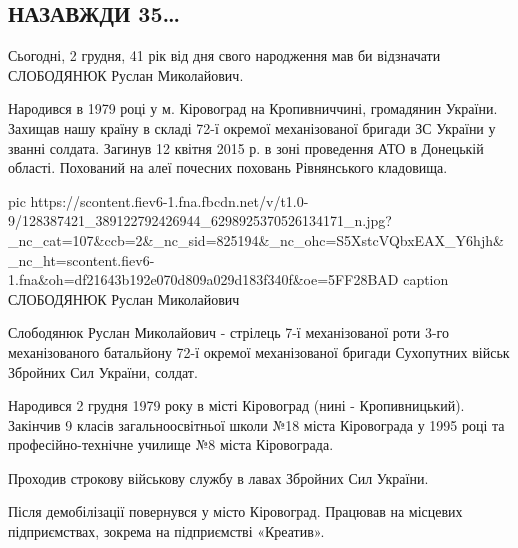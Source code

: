  
 
 
 
 

\subsection{НАЗАВЖДИ 35…}
\label{sec:03_12_2020.fb.patrioty_ukrainy.1.slobodjanjuk_ruslan_mykolajovych_35}

Сьогодні, 2 грудня, 41 рік від дня свого народження мав би відзначати СЛОБОДЯНЮК Руслан Миколайович.


Народився в 1979 році у м. Кіровоград на Кропивниччині, громадянин України.
Захищав нашу країну в складі 72-ї окремої механізованої бригади ЗС України у
званні солдата. Загинув 12 квітня 2015 р. в зоні проведення АТО в Донецькій
області. Похований на алеї почесних поховань Рівнянського кладовища.

\ifcmt
pic https://scontent.fiev6-1.fna.fbcdn.net/v/t1.0-9/128387421_389122792426944_6298925370526134171_n.jpg?_nc_cat=107&ccb=2&_nc_sid=825194&_nc_ohc=S5XstcVQbxEAX_Y6hjh&_nc_ht=scontent.fiev6-1.fna&oh=df21643b192e070d809a029d183f340f&oe=5FF28BAD
caption СЛОБОДЯНЮК Руслан Миколайович
\fi

Слободянюк Руслан Миколайович - стрілець 7-ї механізованої роти 3-го
механізованого батальйону 72-ї окремої механізованої бригади Сухопутних військ
Збройних Сил України, солдат.

Народився 2 грудня 1979 року в місті Кіровоград (нині - Кропивницький).
Закінчив 9 класів загальноосвітньої школи №18 міста Кіровограда у 1995 році та
професійно-технічне училище №8 міста Кіровограда.

Проходив строкову військову службу в лавах Збройних Сил України.

Після демобілізації повернувся у місто Кіровоград. Працював на місцевих
підприємствах, зокрема на підприємстві «Креатив».

